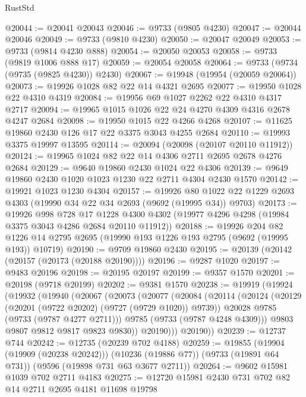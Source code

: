 \begin{lexlean}{RustStd}
\begin{coremodule}
{\begin{coremodule}
{{{{{{{{{{{{{{{{{{{{{{{{{{{{{{{{{{{{{{{{{{{{{{{{{{{{{{{@20044 := @20041 @20043
@20046 := @9733 (@9805 @4230)
@20047 := @20044 @20046
@20049 := @9733 (@9810 @4230)
@20050 := @20047 @20049
@20053 := @9733 (@9814 @4230 @888)
@20054 := @20050 @20053
@20058 := @9733 (@9819 @1006 @888 @17)
@20059 := @20054 @20058
@20064 := @9733 (@9734 (@9735 (@9825 @4230)) @2430)
@20067 := @19948 (@19954 (@20059 @20064))
@20073 := @19926 @1028 @82 @22 @14 @4321 @2695
@20077 := @19950 @1028 @22 @4310 @4319
@20084 := @19956 @69 @1027 @2262 @22 @4310 @4317 @2717
@20094 := @19965 @1015 @1026 @22 @24 @4270 @4309 @4316 @2678 @4247 @2684
@20098 := @19950 @1015 @22 @4266 @4268
@20107 := @11625 @19860 @2430 @126 @17 @22 @3375 @3043 @4255 @2684
@20110 := @19993 @3375 @19997 @13595
@20114 := @20094 (@20098 (@20107 @20110 @11912))
@20124 := @19965 @1024 @82 @22 @14 @4306 @2711 @2695 @2678 @4276 @2684
@20129 := @9640 @19860 @2430 @1024 @22 @4306
@20139 := @9649 @19860 @2430 @1020 @1023 @1230 @22 @2711 @4304 @2430 @1570
@20142 := @19921 @1023 @1230 @4304
@20157 := @19926
    @80
    @1022
    @22
    @1229
    @2693
    @4303
    (@19990 @34 @22 @34 @2693 (@9692 (@19995 @34)) @9703)
@20173 := @19926
    @998
    @728
    @17
    @1228
    @4300
    @4302
    (@19977 @4296 @4298 (@19984 @3375 @3043 @4286 @2684 @20110 @11912))
@20188 := @19926
    @204
    @82
    @1226
    @14
    @2795
    @2695
    (@19990 @193 @1226 @193 @2795 (@9692 (@19995 @193)) @10719)
@20190 := @9709 @19860 @2430
@20195 := @20139 (@20142 (@20157 (@20173 (@20188 @20190))))
@20196 := @9287 @1020
@20197 := @9483 @20196
@20198 := @20195 @20197
@20199 := @9357 @1570
@20201 := @20198 (@9718 @20199)
@20202 := @9381 @1570
@20238 := @19919
    (@19924
      (@19932
        (@19940
          (@20067
            (@20073
              (@20077
                (@20084
                  (@20114
                    (@20124
                      (@20129 (@20201 (@9722 @20202) (@9727 (@9729 @1020)) @9739))
                      @20028
                      @9785
                      (@9733 (@9787 @4277 @2711)))
                    @9785
                    (@9733 (@9787 @4248 @4309)))
                  @9803
                  @9807
                  @9812
                  @9817
                  @9823
                  @9830))
              @20190)))
        @20190))
@20239 := @12737 @744
@20242 := @12735 (@20239 @702 @4188)
@20259 := @19855
    (@19904 (@19909 (@20238 @20242)))
    (@10236 (@19886 @77))
    (@9733 (@19891 @64 @731))
    (@9596 (@19898 @731 @63 @3677 @2711))
@20264 := @9602 @15981 @1039 @702 @2711 @4183
@20275 := @12720 @15981 @2430 @731 @702 @82 @14 @2711 @2695 @4181 @11698 @19798
}}}}}}}}}}}}}}}}}}}}}}}}}}}}}}}}}}}}}}}}}}}}}}}}}}}}}}}
\end{coremodule}}
\end{coremodule}
\end{lexlean}
